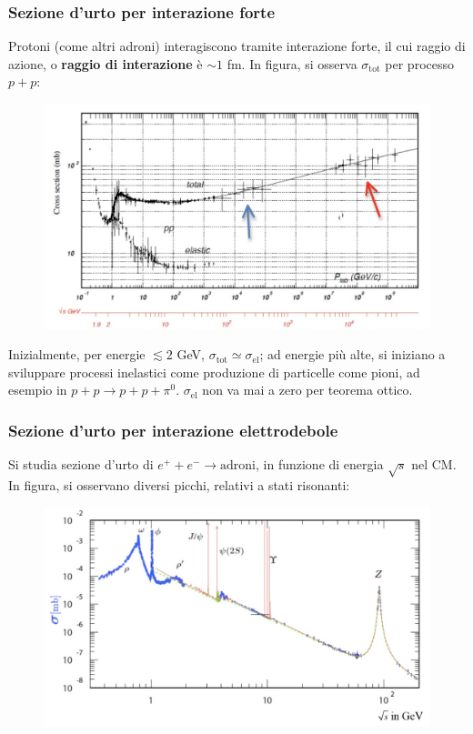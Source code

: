 \documentclass[10pt, a4paper]{scrartcl}
\numberwithin{equation}{subsection}
\theoremstyle{style1}
\begin{document}
\subsubsection{Sezione d'urto per interazione forte}
Protoni (come altri adroni) interagiscono tramite interazione forte, il cui raggio di azione, o \textbf{raggio di interazione} \`e $\sim 1$ fm. In figura, si osserva $\sigma _\text{tot}$ per processo $p+p$:
\begin{figure}[h!]
	\centering
	\includegraphics[width=.85\columnwidth]{f.png}
\end{figure}

\noindent Inizialmente, per energie $\lesssim 2 $ GeV, $\sigma _\text{tot}\simeq \sigma _\text{el}$; ad energie pi\`u alte, si iniziano a sviluppare processi inelastici come produzione di particelle come pioni, ad esempio in $p+p \to p+p+ \pi^0$. $\sigma _\text{el}$ non va mai a zero per teorema ottico.

\subsubsection{Sezione d'urto per interazione elettrodebole}
Si studia sezione d'urto di $e^+ + e^- \to \text{adroni}$, in funzione di energia $\sqrt{s} $ nel CM. In figura, si osservano diversi picchi, relativi a stati risonanti:
\begin{figure}[h!]
	\centering
	\includegraphics[width=.85\columnwidth]{edb.png}
\end{figure}
\end{document}

